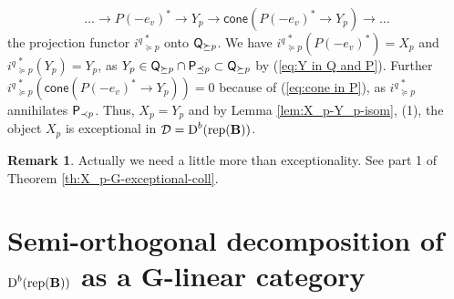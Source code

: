 \documentclass[sn-mathphys-num]{sn-jnl}%
\newcommand{\D}{\mathcal D}
\newcommand{\rep}{{\mathrm{rep}}}
\newcommand*{\Dd}{\mathop{\mathrm D\kern0pt}\nolimits}
\newcommand{\cone}{{\mathsf{cone}}}
\newcommand{\bg}{\mathbf G}
\newcommand{\fb}{\mathbf B}
\theoremstyle{definition}
\newtheorem{remark}[theorem]{Remark}
\begin{document}
\begin{equation}
\dots \rightarrow P(-e_v)^*\rightarrow Y_p\rightarrow \cone(P(-e_v)^*\rightarrow Y_p)\rightarrow \dots 
\end{equation}
the projection functor ${i^q}_{\succeq p}^{\ \ast}$ onto ${\sf Q}_{\succeq p}$.
We have ${i^q}_{\succeq p}^{\ \ast}(P(-e_v)^*)=X_p$ and ${i^q}_{\succeq p}^{\ \ast}(Y_p)=Y_p$, as $Y_p\in{\sf Q}_{\succeq p}\cap {\sf P}_{\preceq p}\subset {\sf Q}_{\succeq p}$ by (\ref{eq:Y in Q and P}). Further ${i^q}_{\succeq p}^{\ \ast}(\cone(P(-e_v)^*\rightarrow Y_p))=0$ because of (\ref{eq:cone in P}), as ${i^q}_{\succeq p}^{\ \ast}$ annihilates ${\sf P}_{\prec p}$. Thus, $X_p=Y_p$ and by Lemma \ref{lem:X_p-Y_p-isom}, (1), the object $X_p$ is exceptional in $\D=
 \Dd^b (\rep ({\fb}))$.

\begin{remark}
    Actually we need a little more than exceptionality. See part 1 of Theorem \ref{th:X_p-G-exceptional-coll}.
\end{remark}
\section{Semi-orthogonal decomposition of $\Dd ^b(\rep(\fb))$ as a 
$\bg$-linear category}\label{sec:SODofB-modoverG-mod}
\end{document}
